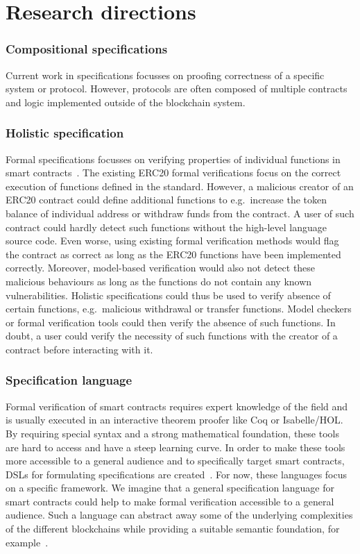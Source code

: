 \section{Research directions}
\label{discuss}

\subsubsection{Compositional specifications}
Current work in specifications focusses on proofing correctness of a specific system or protocol.
However, protocols are often composed of multiple contracts and logic implemented outside of the blockchain system.


\subsubsection{Holistic specification}
Formal specifications focusses on verifying properties of individual functions in smart contracts~\cite{Hildenbrandt2017}.
The existing ERC20 formal verifications focus on the correct execution of functions defined in the standard.
However, a malicious creator of an ERC20 contract could define additional functions to e.g.\ increase the token balance of individual address or withdraw funds from the contract.
A user of such contract could hardly detect such functions without the high-level language source code.
Even worse, using existing formal verification methods would flag the contract as correct as long as the ERC20 functions have been implemented correctly.
Moreover, model-based verification would also not detect these malicious behaviours as long as the functions do not contain any known vulnerabilities.
Holistic specifications could thus be used to verify absence of certain functions, e.g.\ malicious withdrawal or transfer functions.
Model checkers or formal verification tools could then verify the absence of such functions.
In doubt, a user could verify the necessity of such functions with the creator of a contract before interacting with it.

\subsubsection{Specification language}
Formal verification of smart contracts requires expert knowledge of the field and is usually executed in an interactive theorem proofer like Coq or Isabelle/HOL.
By requiring special syntax and a strong mathematical foundation, these tools are hard to access and have a steep learning curve.
In order to make these tools more accessible to a general audience and to specifically target smart contracts, DSLs for formulating specifications are created~\cite{He2018,Erfurt2018,RuntimeVerification2018}.
For now, these languages focus on a specific framework.
We imagine that a general specification language for smart contracts could help to make formal verification accessible to a general audience.
Such a language can abstract away some of the underlying complexities of the different blockchains while providing a suitable semantic foundation, for example~\cite{Sergey2018a,Sergey2017}.

